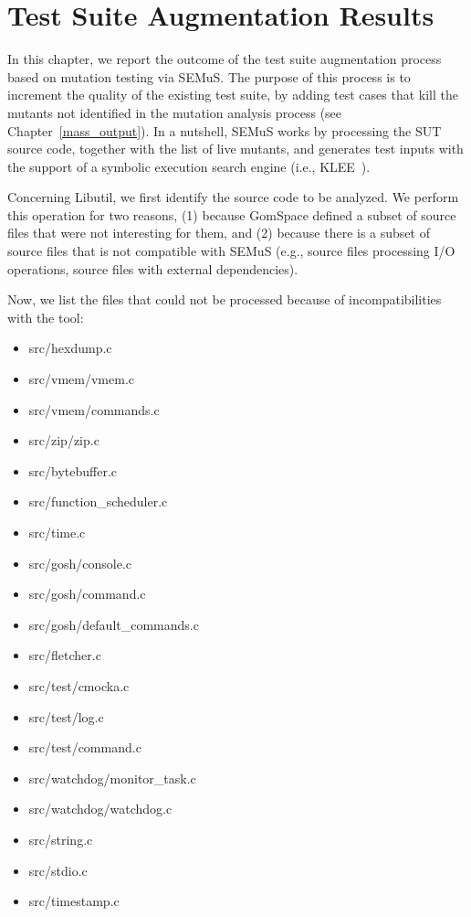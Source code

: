 
\chapter{Test Suite Augmentation Results}

In this chapter, we report the outcome of the test suite augmentation process based on mutation testing via SEMuS. The purpose of this process is to increment the quality of the existing test suite, by adding test cases that kill the mutants not identified in the mutation analysis process (see Chapter~\ref{mass_output}). 
In a nutshell, SEMuS works by processing the SUT source code, together with the list of live mutants, and generates test inputs with the support of a symbolic execution search engine (i.e., KLEE~\cite{cadar2008klee}).


Concerning Libutil, we first identify the source code to be analyzed. We perform this operation for two reasons, (1) because GomSpace defined a subset of source files that were not interesting for them, and (2) because there is a subset of source files that is not compatible with SEMuS (e.g., source files processing I/O operations, source files with external dependencies).  



Now, we list the files that could not be processed because of incompatibilities with the tool:

\begin{itemize}
\item src/hexdump.c
\item src/vmem/vmem.c
\item src/vmem/commands.c
\item src/zip/zip.c
\item src/bytebuffer.c
\item src/function\_scheduler.c
\item src/time.c
\item src/gosh/console.c
\item src/gosh/command.c
\item src/gosh/default\_commands.c
\item src/fletcher.c
\item src/test/cmocka.c
\item src/test/log.c
\item src/test/command.c
\item src/watchdog/monitor\_task.c
\item src/watchdog/watchdog.c
\item src/string.c
\item src/stdio.c
\item src/timestamp.c
\end{itemize}

